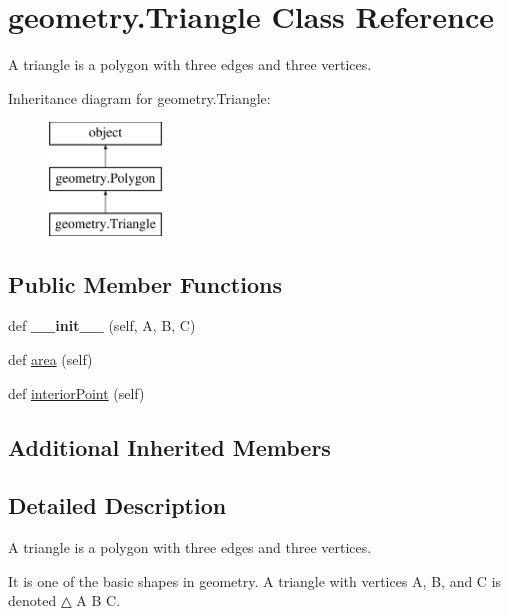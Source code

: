 \hypertarget{classgeometry_1_1Triangle}{}\section{geometry.\+Triangle Class Reference}
\label{classgeometry_1_1Triangle}


A triangle is a polygon with three edges and three vertices.  


Inheritance diagram for geometry.\+Triangle\+:\begin{figure}[H]
\begin{center}
\leavevmode
\includegraphics[height=3.000000cm]{classgeometry_1_1Triangle}
\end{center}
\end{figure}
\subsection*{Public Member Functions}
\begin{DoxyCompactItemize}
\item 
\mbox{\label{classgeometry_1_1Triangle_a4e7dfc53b80ea22d888ed43d9b401cf5}} 
def {\bfseries \+\_\+\+\_\+init\+\_\+\+\_\+} (self, A, B, C)
\item 
def \hyperlink{classgeometry_1_1Triangle_aefd0596cf3d91438d5214c303d426bc6}{area} (self)
\item 
def \hyperlink{classgeometry_1_1Triangle_a714f4af89b1855e957797e2c53568893}{interior\+Point} (self)
\end{DoxyCompactItemize}
\subsection*{Additional Inherited Members}


\subsection{Detailed Description}
A triangle is a polygon with three edges and three vertices. 

It is one of the basic shapes in geometry. A triangle with vertices A, B, and C is denoted △ A B C.

